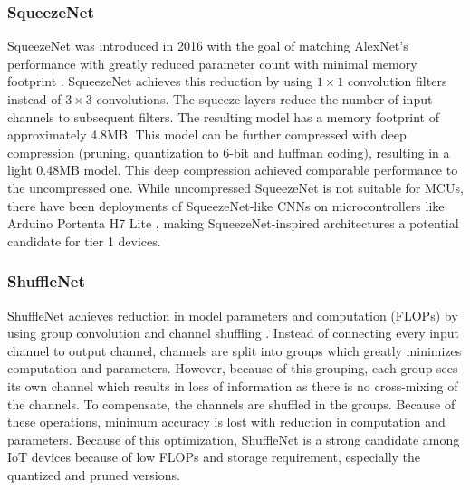 \documentclass[conference]{IEEEtran}
\begin{document}
	\subsubsection{SqueezeNet}
	SqueezeNet was introduced in 2016 with the goal of matching AlexNet's \cite{alexnet2012} performance with greatly reduced parameter count with minimal memory footprint \cite{squeezenet2016}. SqueezeNet achieves this reduction by using $1\times1$ convolution filters instead of $3\times3$ convolutions. The squeeze layers reduce the number of input channels to subsequent filters. The resulting model has a memory footprint of approximately 4.8MB. This model can be further compressed with deep compression \cite{han2015} (pruning, quantization to 6-bit and huffman coding), resulting in a light 0.48MB model. This deep compression achieved comparable performance to the uncompressed one. While uncompressed SqueezeNet is not suitable for MCUs, there have been deployments of SqueezeNet-like CNNs on microcontrollers like Arduino Portenta H7 Lite \cite{lillo2024}, making SqueezeNet-inspired architectures a potential candidate for tier 1 devices.
	
	\subsubsection{ShuffleNet}
	ShuffleNet achieves reduction in model parameters and computation (FLOPs) by using group convolution and channel shuffling \cite{shufflenet2017}. Instead of connecting every input channel to output channel, channels are split into groups which greatly minimizes computation and parameters. However, because of this grouping, each group sees its own channel which results in loss of information as there is no cross-mixing of the channels. To compensate, the channels are shuffled in the groups. Because of these operations, minimum accuracy is lost with reduction in computation and parameters. Because of this optimization, ShuffleNet is a strong candidate among IoT devices because of low FLOPs and storage requirement, especially the quantized and pruned versions.
	
\end{document}
